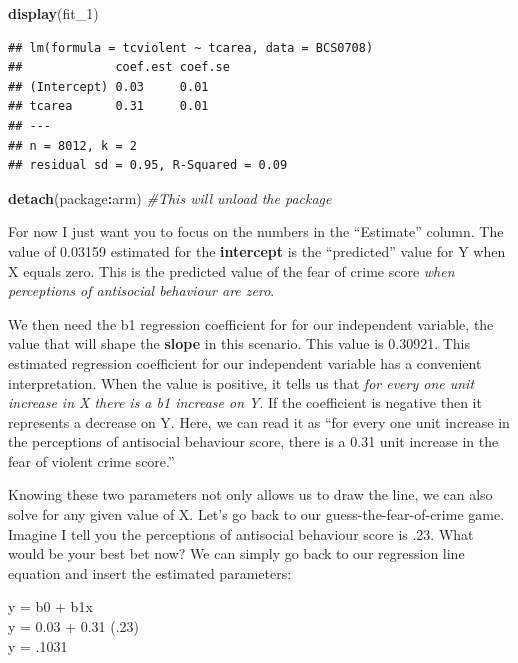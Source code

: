 \documentclass[]{book}
\newenvironment{Shaded}{\begin{snugshade}}{\end{snugshade}}
\newcommand{\CommentTok}[1]{\textcolor[rgb]{0.56,0.35,0.01}{\textit{#1}}}
\newcommand{\DecValTok}[1]{\textcolor[rgb]{0.00,0.00,0.81}{#1}}
\newcommand{\KeywordTok}[1]{\textcolor[rgb]{0.13,0.29,0.53}{\textbf{#1}}}
\newcommand{\NormalTok}[1]{#1}
\newcommand{\OperatorTok}[1]{\textcolor[rgb]{0.81,0.36,0.00}{\textbf{#1}}}
\theoremstyle{definition}
\theoremstyle{definition}
\theoremstyle{definition}
\theoremstyle{remark}
\begin{document}
\begin{Shaded}
\begin{Highlighting}[]
\KeywordTok{display}\NormalTok{(fit_}\DecValTok{1}\NormalTok{)}
\end{Highlighting}
\end{Shaded}

\begin{verbatim}
## lm(formula = tcviolent ~ tcarea, data = BCS0708)
##             coef.est coef.se
## (Intercept) 0.03     0.01   
## tcarea      0.31     0.01   
## ---
## n = 8012, k = 2
## residual sd = 0.95, R-Squared = 0.09
\end{verbatim}

\begin{Shaded}
\begin{Highlighting}[]
\KeywordTok{detach}\NormalTok{(package}\OperatorTok{:}\NormalTok{arm) }\CommentTok{#This will unload the package}
\end{Highlighting}
\end{Shaded}

For now I just want you to focus on the numbers in the ``Estimate''
column. The value of 0.03159 estimated for the \textbf{intercept} is the
``predicted'' value for Y when X equals zero. This is the predicted
value of the fear of crime score \emph{when perceptions of antisocial
behaviour are zero}.

We then need the b1 regression coefficient for for our independent
variable, the value that will shape the \textbf{slope} in this scenario.
This value is 0.30921. This estimated regression coefficient for our
independent variable has a convenient interpretation. When the value is
positive, it tells us that \emph{for every one unit increase in X there
is a b1 increase on Y}. If the coefficient is negative then it
represents a decrease on Y. Here, we can read it as ``for every one unit
increase in the perceptions of antisocial behaviour score, there is a
0.31 unit increase in the fear of violent crime score.''

Knowing these two parameters not only allows us to draw the line, we can
also solve for any given value of X. Let's go back to our
guess-the-fear-of-crime game. Imagine I tell you the perceptions of
antisocial behaviour score is .23. What would be your best bet now? We
can simply go back to our regression line equation and insert the
estimated parameters:

y = b0 + b1x\\
y = 0.03 + 0.31 (.23)\\
y = .1031
\end{document}
